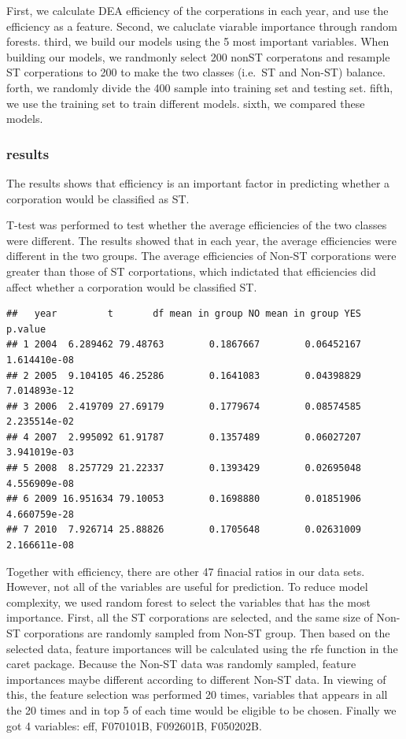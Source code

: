 \documentclass[]{article}
\begin{document}
First, we calculate DEA efficiency of the corperations in each year, and
use the efficiency as a feature. Second, we caluclate viarable
importance through random forests. third, we build our models using the
5 most important variables. When building our models, we randmonly
select 200 nonST corperatons and resample ST corperations to 200 to make
the two classes (i.e.~ST and Non-ST) balance. forth, we randomly divide
the 400 sample into training set and testing set. fifth, we use the
training set to train different models. sixth, we compared these models.

\subsubsection{results}\label{results}

The results shows that efficiency is an important factor in predicting
whether a corporation would be classified as ST.


T-test was performed to test whether the average efficiencies of the two
classes were different. The results showed that in each year, the
average efficiencies were different in the two groups. The average
efficiencies of Non-ST corporations were greater than those of ST
corportations, which indictated that efficiencies did affect whether a
corporation would be classified ST.

\begin{verbatim}
##   year         t       df mean in group NO mean in group YES      p.value
## 1 2004  6.289462 79.48763        0.1867667        0.06452167 1.614410e-08
## 2 2005  9.104105 46.25286        0.1641083        0.04398829 7.014893e-12
## 3 2006  2.419709 27.69179        0.1779674        0.08574585 2.235514e-02
## 4 2007  2.995092 61.91787        0.1357489        0.06027207 3.941019e-03
## 5 2008  8.257729 21.22337        0.1393429        0.02695048 4.556909e-08
## 6 2009 16.951634 79.10053        0.1698880        0.01851906 4.660759e-28
## 7 2010  7.926714 25.88826        0.1705648        0.02631009 2.166611e-08
\end{verbatim}

Together with efficiency, there are other 47 finacial ratios in our data
sets. However, not all of the variables are useful for prediction. To
reduce model complexity, we used random forest to select the variables
that has the most importance. First, all the ST corporations are
selected, and the same size of Non-ST corporations are randomly sampled
from Non-ST group. Then based on the selected data, feature importances
will be calculated using the rfe function in the caret package. Because
the Non-ST data was randomly sampled, feature importances maybe
different according to different Non-ST data. In viewing of this, the
feature selection was performed 20 times, variables that appears in all
the 20 times and in top 5 of each time would be eligible to be chosen.
Finally we got 4 variables: eff, F070101B, F092601B, F050202B.
\end{document}
